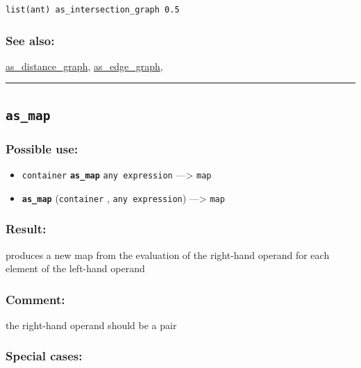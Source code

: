 \documentclass[]{book}
\providecommand{\tightlist}{%
  \setlength{\itemsep}{0pt}\setlength{\parskip}{0pt}}
\theoremstyle{definition}
\theoremstyle{definition}
\theoremstyle{definition}
\theoremstyle{remark}
\begin{document}
\begin{verbatim}
list(ant) as_intersection_graph 0.5 
\end{verbatim}

\subsubsection{See also:}\label{see-also-36}

\href{operators-a-to-a.html\#as_distance_graph}{as\_distance\_graph},
\href{operators-a-to-a.html\#as_edge_graph}{as\_edge\_graph},

\begin{center}\rule{0.5\linewidth}{\linethickness}\end{center}

\subsection{\texorpdfstring{\texttt{as\_map}}{as\_map}}\label{as_map}

\subsubsection{Possible use:}\label{possible-use-52}

\begin{itemize}
\tightlist
\item
  \texttt{container} \textbf{\texttt{as\_map}} \texttt{any\ expression}
  ---\textgreater{} \texttt{map}
\item
  \textbf{\texttt{as\_map}} (\texttt{container} ,
  \texttt{any\ expression}) ---\textgreater{} \texttt{map}
\end{itemize}

\subsubsection{Result:}\label{result-51}

produces a new map from the evaluation of the right-hand operand for
each element of the left-hand operand

\subsubsection{Comment:}\label{comment-11}

the right-hand operand should be a pair

\subsubsection{Special cases:}\label{special-cases-20}
\end{document}
